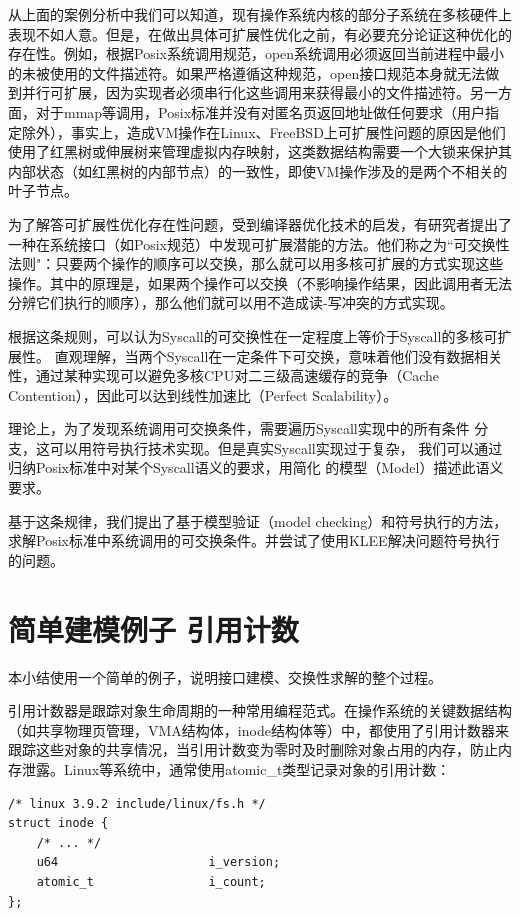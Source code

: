 从上面的案例分析中我们可以知道，现有操作系统内核的部分子系统在多核硬件上表现不如人意。但是，在做出具体可扩展性优化之前，有必要充分论证这种优化的存在性。例如，根据Posix系统调用规范，open系统调用必须返回当前进程中最小的未被使用的文件描述符。如果严格遵循这种规范，open接口规范本身就无法做到并行可扩展，因为实现者必须串行化这些调用来获得最小的文件描述符。另一方面，对于mmap等调用，Posix标准并没有对匿名页返回地址做任何要求（用户指定除外），事实上，造成VM操作在Linux、FreeBSD上可扩展性问题的原因是他们使用了红黑树或伸展树来管理虚拟内存映射\cite{radixvm:eurosys13}，这类数据结构需要一个大锁来保护其内部状态（如红黑树的内部节点）的一致性，即使VM操作涉及的是两个不相关的叶子节点。

为了解答可扩展性优化存在性问题，受到编译器优化技术的启发，有研究者提出了一种在系统接口（如Posix规范）中发现可扩展潜能的方法\cite{commuter:2013}。他们称之为``可交换性法则"：只要两个操作的顺序可以交换，那么就可以用多核可扩展的方式实现这些操作。其中的原理是，如果两个操作可以交换（不影响操作结果，因此调用者无法分辨它们执行的顺序），那么他们就可以用不造成读-写冲突的方式实现。

根据这条规则，可以认为Syscall的可交换性在一定程度上等价于Syscall的多核可扩展性。
直观理解，当两个Syscall在一定条件下可交换，意味着他们没有数据相关性，通过某种实现可以避免多核CPU对二三级高速缓存的竞争（Cache
Contention），因此可以达到线性加速比（Perfect Scalability）。

理论上，为了发现系统调用可交换条件，需要遍历Syscall实现中的所有条件
分支，这可以用符号执行技术实现。但是真实Syscall实现过于复杂，
我们可以通过归纳Posix标准中对某个Syscall语义的要求，用简化
的模型（Model）描述此语义要求。

基于这条规律，我们提出了基于模型验证（model
checking）和符号执行的方法，求解Posix标准中系统调用的可交换条件。并尝试了使用KLEE\cite{Cadar:2008:KUA:1855741.1855756}解决问题符号执行的问题。

\section{简单建模例子 \pozhehao 引用计数}
本小结使用一个简单的例子，说明接口建模、交换性求解的整个过程。

引用计数器是跟踪对象生命周期的一种常用编程范式。在操作系统的关键数据结构（如共享物理页管理，VMA结构体，inode结构体等）中，都使用了引用计数器来跟踪这些对象的共享情况，当引用计数变为零时及时删除对象占用的内存，防止内存泄露。Linux等系统中，通常使用atomic\_t类型记录对象的引用计数：

\begin{lstlisting}
/* linux 3.9.2 include/linux/fs.h */
struct inode {
	/* ... */
	u64                     i_version;
	atomic_t                i_count;
};
\end{lstlisting}


